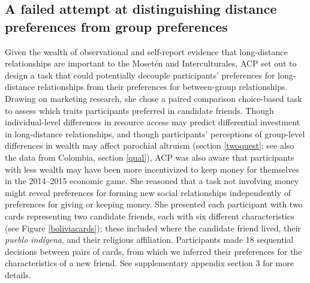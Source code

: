 \documentclass[bibauthoryear]{aa}
\begin{document}
\subsection{A failed attempt at distinguishing distance preferences from group preferences}

Given the wealth of observational and self-report evidence that long-distance relationships are important to the Moset\'en and Interculturales, ACP set out to design a task that could potentially decouple participants' preferences for long-distance relationships from their preferences for between-group relationships. Drawing on marketing research, she chose a paired comparison choice-based task \citep{rao2014applied} to assess which traits participants preferred in candidate friends. Though individual-level differences in resource access may predict differential investment in long-distance relationships, and though participants' perceptions of group-level differences in wealth may affect parochial altruism (section \ref{twoquest}; see also the data from Colombia, section \ref{qual}), ACP was also aware that participants with less wealth may have been more incentivized to keep money for themselves in the 2014--2015 economic game. She reasoned that a task not involving money might reveal preferences for forming new social relationships independently of preferences for giving or keeping money. She presented each participant with two cards representing two candidate friends, each with six different characteristics (see Figure \ref{boliviacards}); these included where the candidate friend lived, their \textit{pueblo ind\'igena}, and their religious affiliation. Participants made 18 sequential decisions between pairs of cards, from which we inferred their preferences for the characteristics of a new friend. See supplementary appendix section 3 for more details.
\end{document}
